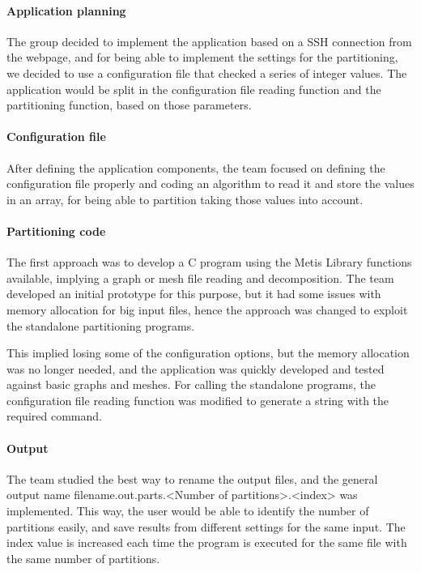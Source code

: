 \documentclass{cranfieldChart}
\begin{document}
\paragraph{Application planning}
The group decided to implement the application based on a SSH connection from the webpage, and for being able to implement the settings for the partitioning, we decided to use a configuration file that checked a series of integer values. The application would be split in the configuration file reading function and the partitioning function, based on those parameters.

\paragraph{Configuration file}
After defining the application components, the team focused on defining the configuration file properly and coding an algorithm to read it and store the values in an array, for being able to partition taking those values into account.

\paragraph{Partitioning code}
The first approach was to develop a C program using the Metis Library functions available, implying a graph or mesh file reading and decomposition. The team developed an initial prototype for this purpose, but it had some issues with memory allocation for big input files, hence the approach was changed to exploit the standalone partitioning programs.

This implied losing some of the configuration options, but the memory allocation was no longer needed, and the application was quickly developed and tested against basic graphs and meshes. For calling the standalone programs, the configuration file reading function was modified to generate a string with the required command.

\paragraph{Output}
The team studied the best way to rename the output files, and the general output name filename.out.parts.<Number of partitions>.<index> was implemented. This way, the user would be able to identify the number of partitions easily, and save results from different settings for the same input. The index value is increased each time the program is executed for the same file with the same number of partitions.
\end{document}
